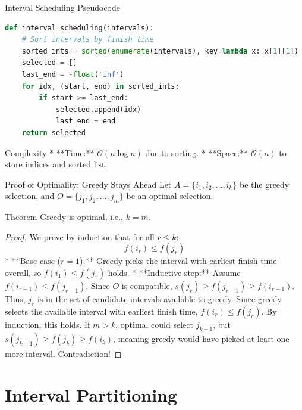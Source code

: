 \documentclass[aspectratio=169,xcolor=dvipsnames]{beamer}
\begin{document}
\begin{frame}[fragile]{Interval Scheduling Pseudocode}
  \begin{lstlisting}[language=Python]
def interval_scheduling(intervals):
    # Sort intervals by finish time
    sorted_ints = sorted(enumerate(intervals), key=lambda x: x[1][1])
    selected = []
    last_end = -float('inf')
    for idx, (start, end) in sorted_ints:
        if start >= last_end:
            selected.append(idx)
            last_end = end
    return selected
  \end{lstlisting}
  \begin{block}{Complexity}
    * **Time:** $\mathcal{O}(n \log n)$ due to sorting.
    * **Space:** $\mathcal{O}(n)$ to store indices and sorted list.
  \end{block}
\end{frame}

\begin{frame}{Proof of Optimality: Greedy Stays Ahead}
  Let $A = \{i_1, i_2, \ldots, i_k\}$ be the greedy selection, and $O = \{j_1, j_2, \ldots, j_m\}$ be an optimal selection.
  \begin{block}{Theorem}
    Greedy is optimal, i.e., $k = m$.
  \end{block}
  \begin{proof}
    We prove by induction that for all $r \le k$:
    $$f(i_r) \le f(j_r)$$
    * **Base case ($r=1$):** Greedy picks the interval with earliest finish time overall, so $f(i_1) \le f(j_1)$ holds.
    * **Inductive step:** Assume $f(i_{r-1}) \le f(j_{r-1})$. Since $O$ is compatible, $s(j_r) \ge f(j_{r-1}) \ge f(i_{r-1})$. Thus, $j_r$ is in the set of candidate intervals available to greedy. Since greedy selects the available interval with earliest finish time, $f(i_r) \le f(j_r)$.
    By induction, this holds. If $m > k$, optimal could select $j_{k+1}$, but $s(j_{k+1}) \ge f(j_k) \ge f(i_k)$, meaning greedy would have picked at least one more interval. Contradiction!
  \end{proof}
\end{frame}

\section{Interval Partitioning}
\end{document}
